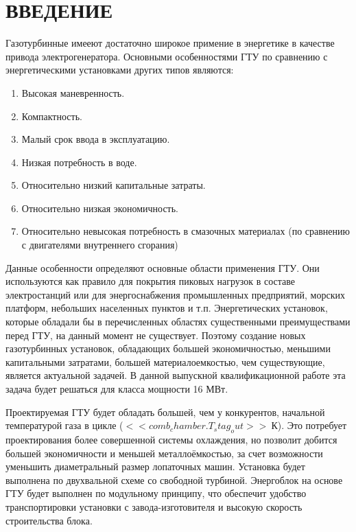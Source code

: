 \documentclass[a4paper,12pt]{article}
\begin{document}
    \section{ВВЕДЕНИЕ}
    Газотурбинные имееют достаточно широкое примение в энергетике в качестве привода электрогенератора.
    Основными особенностями ГТУ по сравнению с энергетическими установками других типов являются:
    \begin{enumerate}
        \item Высокая маневренность.
        \item Компактность.
        \item Малый срок ввода в эксплуатацию.
        \item Низкая потребность в воде.
        \item Относительно низкий капитальные затраты.
        \item Относительно низкая экономичность.
        \item Относительно невысокая потребность в смазочных материалах (по сравнению с двигателями
        внутреннего сгорания)
    \end{enumerate}
    Данные особенности определяют основные области применения ГТУ.
    Они используются как правило для покрытия пиковых нагрузок в составе электростанций или для
    энергоснабжения промышленных предприятий, морских платформ, небольших населенных пунктов и т.п.
    Энергетических установок, которые обладали бы в перечисленных областях существенными преимуществами перед ГТУ, на
    данный момент не существует.
    Поэтому создание новых газотурбинных установок, обладающих большей экономичностью,
    меньшими капитальными затратами, большей материалоемкостью, чем существующие, является актуальной задачей.
    В данной выпускной квалификационной работе эта задача будет решаться для класса мощности 16 МВт.

    Проектируемая ГТУ будет обладать большей, чем у конкурентов, начальной температурой газа в цикле
    ($ << comb_chamber.T_stag_out >>\ К $).
    Это потребует проектирования более совершенной системы охлаждения, но позволит добится большей экономичности и
    меньшей металлоёмкостью, за счет возможности уменьшить диаметральный размер лопаточных машин.
    Установка будет выполнена по двухвальной схеме со свободной турбиной.
    Энергоблок на основе ГТУ будет выполнен по модульному принципу, что обеспечит удобство транспортировки установки с
    завода-изготовителя и высокую скорость строительства блока.

    \newpage
\end{document}
